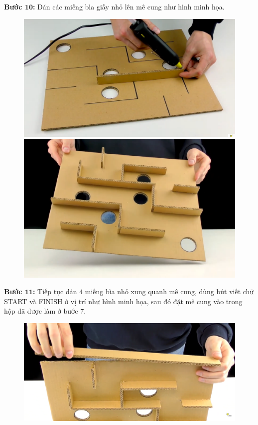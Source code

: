 \begin{multicols}{2}
\begin{figure}[H]
		\vspace*{-10pt}
	\end{figure}
	\textbf{\color{toancuabi}Bước $\pmb{10}$:} Dán các miếng bìa giấy nhỏ lên mê cung như hình minh họa.
	\begin{figure}[H]
		\vspace*{-5pt}
		\centering
		\captionsetup{labelformat= empty, justification=centering}
		\includegraphics[width= 0.9\linewidth]{16}
		\includegraphics[width= 0.9\linewidth]{17}
		\vspace*{-10pt}
	\end{figure}
	\textbf{\color{toancuabi}Bước $\pmb{11}$:} Tiếp tục dán $4$ miếng bìa nhỏ xung quanh mê cung, dùng bút viết chữ START và FINISH ở vị trí như hình minh họa, sau đó đặt mê cung vào trong hộp đã được làm ở bước $7$.
	\begin{figure}[H]
		\vspace*{-5pt}
		\centering
		\captionsetup{labelformat= empty, justification=centering}
		\includegraphics[width= 0.9\linewidth]{18}

\end{figure}
\end{multicols}
